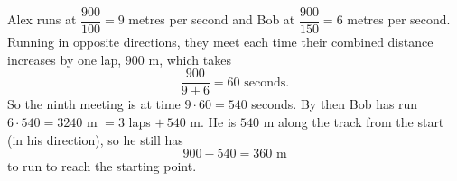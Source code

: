 Alex runs at $\dfrac{900}{100}=9$ metres per second and Bob at $\dfrac{900}{150}=6$ metres per second. Running in opposite directions, they meet each time their combined distance increases by one lap, $900$ m, which takes
\[
\dfrac{900}{9+6}=60\text{ seconds}.
\]
So the ninth meeting is at time $9\cdot60=540$ seconds. By then Bob has run $6\cdot540=3240$ m $=3$ laps $+\,540$ m. He is $540$ m along the track from the start (in his direction), so he still has
\[
900-540=\boxed{360}\text{ m}
\]
to run to reach the starting point.
